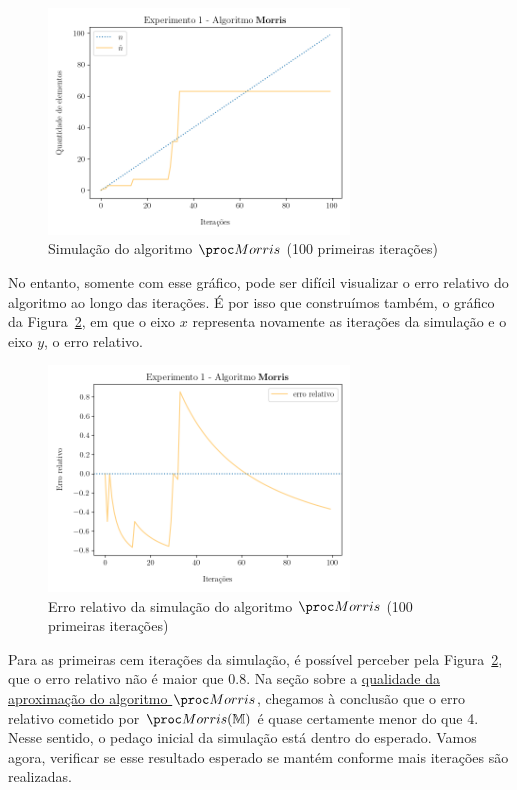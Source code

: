 \begin{figure}[h]
  \centering
  \includegraphics[height=6cm, width=\textwidth]{figuras/morris_first.png}
	\caption{Simulação do algoritmo $\Morris$ (100 primeiras iterações)}
  \label{fig:morris:100}
\end{figure}

No entanto, somente com esse gráfico, pode ser difícil visualizar o erro relativo do algoritmo ao longo das iterações. 
É por isso que construímos também, o gráfico da Figura~\ref{fig:morris:error:100}, em que o eixo $x$ representa 
novamente as iterações da simulação e o eixo $y$, o erro relativo.

\begin{figure}[h]
  \centering
  \includegraphics[height=6cm, width=\textwidth]{figuras/morris_erro_first.png}
	\caption{Erro relativo da simulação do algoritmo $\Morris$ (100 primeiras iterações)}
  \label{fig:morris:error:100}
\end{figure}

Para as primeiras cem iterações da simulação, é possível perceber pela Figura~\ref{fig:morris:error:100}, que o erro 
relativo não é maior que $0.8$. Na seção sobre a 
\hyperref[sec:morris:analysis]{qualidade da aproximação do algoritmo $\Morris$}, chegamos à conclusão que o erro 
relativo cometido por $\Morris(\Mbb)$ é quase certamente menor do que 4. Nesse sentido, o pedaço inicial da simulação 
está dentro do esperado. Vamos agora, verificar se esse resultado esperado se mantém conforme mais iterações são 
realizadas.

